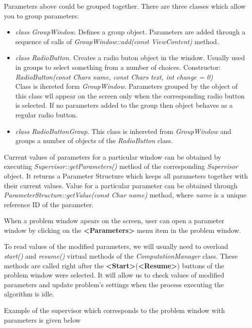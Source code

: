 \documentclass[12pt]{article}
\begin{document}
Parameters above could be grouped together. There are three  classes 
which allow you to group parameters:
\begin{itemize}
\item \emph{class  GroupWindow}. Defines a group
object. Parameters are added through a sequence of calls of 
\emph{GroupWindow::add(const ViewContent)} method.
\item \emph{class RadioButton.} Creates a radio buton object in the
window. Usually used in groups to select something from a number of choices.
Constructor:\\
\emph{ RadioButton(const Chars name, const Chars text, int change = 0)} \\
Class is ihereted form \emph{GroupWindow}.
Parameters grouped by the object of this
class wll appear on the screen only when the corresponding
radio button is selected. If no parameters added to the group then
object behaves as a regular radio button.
\item \emph{class  RadioButtonGroup}. This class
is inhereted from \emph{GroupWindow} and groups a number
of objects of the \emph{RadioButton} class.
\end{itemize}

Current values of parameters for a particular window can be obtained
by executing  \emph{Supervisor::getParameters()} method
of the corresponding \emph{Supervisor} object.
It returns a Parameter Structure which keeps all parameters together
with their current values. Value for  a particular parameter can
be obtained through \emph{ParameterStructure::getValue(const Char name)}
method, where \emph{name} is a unique reference ID of the parameter.


When a problem window apears on the screen, user can open a  parameter
window by clicking  on the \textbf{<Parameters>} menu item in the problem window.

To read values of the modified parameters, we will usually need to 
overload \emph{start()} and \emph{resume()} virtual methods of the
\emph{ComputationManager} class. These methods are called right after
the  \textbf{<Start>}(\textbf{<Resume>}) buttons of the problem window
were selected. It will allow us to check values of 
modified parameters and update problem's settings when the process executing 
the algorithm is idle.

Example of the supervisor which corresponds to the problem window with
parameters is given below
\end{document}
